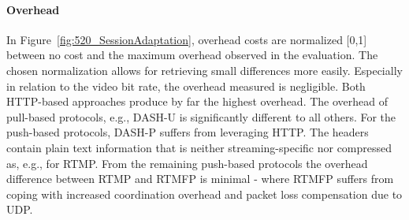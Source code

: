 \paragraph{Overhead}
In Figure~\ref{fig:520_SessionAdaptation}, overhead costs are normalized [0,1] between no cost and the maximum overhead observed in the evaluation.
The chosen normalization allows for retrieving small differences more easily.
Especially in relation to the video bit rate, the overhead measured is negligible.
Both \ac{HTTP}-based approaches produce by far the highest overhead.
The overhead of pull-based protocols, e.g., \ac{DASH-U} is significantly different to all others.
For the push-based protocols, \ac{DASH-P} suffers from leveraging \ac{HTTP}.
The headers contain plain text information that is neither streaming-specific nor compressed as, e.g., for \ac{RTMP}.
From the remaining push-based protocols the overhead difference between \ac{RTMP} and \ac{RTMFP} is minimal - where \ac{RTMFP} suffers from coping with increased coordination overhead and packet loss compensation due to \ac{UDP}. 

